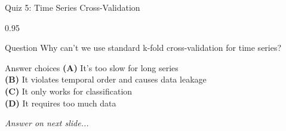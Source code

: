 \documentclass[9pt, aspectratio=169, t]{beamer}
\begin{document}
\begin{frame}{Quiz 5: Time Series Cross-Validation}
    \begin{cminipage}{0.95\textwidth}
    \begin{alertblock}{Question}
        Why can't we use standard k-fold cross-validation for time series?
    \end{alertblock}

    \vspace{0.4cm}

    \begin{block}{Answer choices}
        \textcolor{MainBlue}{\textbf{(A)}} It's too slow for long series\\[3pt]
        \textcolor{MainBlue}{\textbf{(B)}} It violates temporal order and causes data leakage\\[3pt]
        \textcolor{MainBlue}{\textbf{(C)}} It only works for classification\\[3pt]
        \textcolor{MainBlue}{\textbf{(D)}} It requires too much data
    \end{block}

    \vspace{0.5cm}

    \begin{center}
        \textit{Answer on next slide...}
    \end{center}
    \end{cminipage}
\end{frame}
\end{document}
